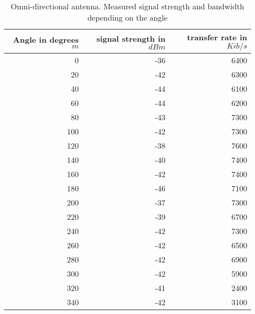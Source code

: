 \begin{table}
	\begin{center}
		\begin{tabular}{r|r|r}\
			Angle in degrees $m$ & signal strength in $dBm$ & transfer rate in $Kib/s$\\
			\hline 
			0 & -36 & 6400\\
			20 & -42 & 6300\\
			40 & -44 & 6100\\
			60 & -44 & 6200\\
			80 & -43 & 7300\\
			100 & -42 & 7300\\
			120 & -38 & 7600\\
			140 & -40 & 7400\\
			160 & -42 & 7400\\
			180 & -46 & 7100\\
			200 & -37 & 7300\\
			220 & -39 & 6700\\
			240 & -42 & 7300\\
			260 & -42 & 6500\\
			280 & -42 & 6900\\
			300 & -42 & 5900\\
			320 & -41 & 2400\\
			340 & -42 & 3100\\
		\end{tabular}
	\end{center}
	\caption{Omni-directional antenna. Measured signal strength and bandwidth depending on the angle}
	\label{ang:omni}
\end{table}